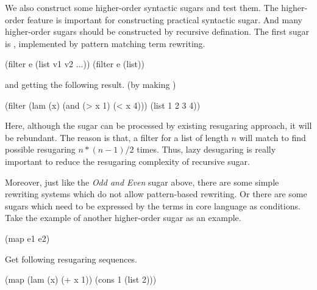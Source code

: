 We also construct some higher-order syntactic sugars and test them. The higher-order feature is important for constructing practical syntactic sugar. And many higher-order sugars should be constructed by recursive defination. The first sugar is , implemented by pattern matching term rewriting.

\begin{Codes}
   (filter e (list v1 v2 ...))
   (filter e (list)) 
\end{Codes}
and getting the following result. (by making   )

\begin{Codes}
    (filter (lam (x) (and (> x 1) (< x 4))) (list 1 2 3 4))
\end{Codes}

Here, although the sugar can be processed by existing resugaring approach, it will be rebundant. The reason is that, a filter for a list of length $n$ will match to find possible resugaring $n*(n-1)/2$ times. Thus, lazy desugaring is really important to reduce the resugaring complexity of recursive sugar.

Moreover, just like the \emph{Odd and Even} sugar above, there are some simple rewriting systems which do not allow pattern-based rewriting. Or there are some sugars which need to be expressed by the terms in core language as conditions. Take the example of another higher-order sugar  as an example.
\begin{Codes}
    (map e1 e2)
\end{Codes}
Get following resugaring sequences.
\begin{Codes}
    (map (lam (x) (+ x 1)) (cons 1 (list 2)))
\end{Codes}

